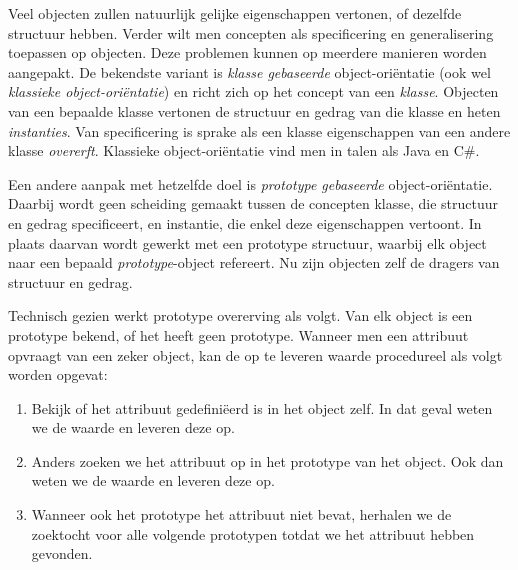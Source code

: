 Veel objecten zullen natuurlijk gelijke eigenschappen vertonen, of dezelfde structuur hebben. Verder wilt men concepten als specificering en generalisering toepassen op objecten. Deze problemen kunnen op meerdere manieren worden aangepakt. De bekendste variant is \emph{klasse gebaseerde} object-oriëntatie (ook wel \emph{klassieke object-oriëntatie}) en richt zich op het concept van een \emph{klasse}. Objecten van een bepaalde klasse vertonen de structuur en gedrag van die klasse en heten \emph{instanties}. Van specificering is sprake als een klasse eigenschappen van een andere klasse \emph{overerft}. Klassieke object-oriëntatie vind men in talen als Java en C\#.

Een andere aanpak met hetzelfde doel is \emph{prototype gebaseerde} object-oriëntatie. Daarbij wordt geen scheiding gemaakt tussen de concepten klasse, die structuur en gedrag specificeert, en instantie, die enkel deze eigenschappen vertoont. In plaats daarvan wordt gewerkt met een prototype structuur, waarbij elk object naar een bepaald \emph{prototype}-object refereert. Nu zijn objecten zelf de dragers van structuur en gedrag.

Technisch gezien werkt prototype overerving als volgt. Van elk object is een prototype bekend, of het heeft geen prototype. Wanneer men een attribuut opvraagt van een zeker object, kan de op te leveren waarde procedureel als volgt worden opgevat:

\begin{enumerate}
  \item Bekijk of het attribuut gedefiniëerd is in het object zelf. In dat geval weten we de waarde en leveren deze op.
  \item Anders zoeken we het attribuut op in het prototype van het object. Ook dan weten we de waarde en leveren deze op.
  \item Wanneer ook het prototype het attribuut niet bevat, herhalen we de zoektocht voor alle volgende prototypen totdat we het attribuut hebben gevonden.
\end{enumerate}

